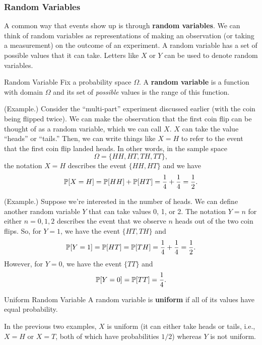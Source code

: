 \documentclass[letterpaper]{article}
\begin{document}
\subsubsection{Random Variables}
A common way that events show up is through \textbf{random variables}. We can think of random variables as representations of making an observation (or taking a measurement) on the outcome of an experiment. A random variable has a set of possible values that it can take. Letters like $X$ or $Y$ can be used to denote random variables. 
\begin{definition}{Random Variable}{}
    Fix a probability space $\Omega$. A \textbf{random variable} is a function with domain $\Omega$ and its set of \emph{possible} values is the range of this function. 
\end{definition}

\begin{mdframed}
    (Example.) Consider the ``multi-part'' experiment discussed earlier (with the coin being flipped twice). We can make the observation that the first coin flip can be thought of as a random variable, which we can call $X$. $X$ can take the value ``heads'' or ``tails.'' Then, we can write things like $X = H$ to refer to the event that the first coin flip landed heads. In other words, in the sample space \[\Omega = \{HH, HT, TH, TT\},\] the notation $X = H$ describes the event $\{HH, HT\}$ and we have \[\mathbb{P}[X = H] = \mathbb{P}[HH] + \mathbb{P}[HT] = \frac{1}{4} + \frac{1}{4} = \frac{1}{2}.\]
\end{mdframed}

\begin{mdframed}
    (Example.) Suppose we're interested in the number of heads. We can define another random variable $Y$ that can take values 0, 1, or 2. The notation $Y = n$ for either $n = 0, 1, 2$ describes the event that we observe $n$ heads out of the two coin flips. So, for $Y = 1$, we have the event $\{HT, TH\}$ and \[\mathbb{P}[Y = 1] = \mathbb{P}[HT] = \mathbb{P}[TH] = \frac{1}{4} + \frac{1}{4} = \frac{1}{2}.\]
    However, for $Y = 0$, we have the event $\{TT\}$ and \[\mathbb{P}[Y = 0] = \mathbb{P}[TT] = \frac{1}{4}.\]
\end{mdframed}

\begin{definition}{Uniform Random Variable}{}
    A random variable is \textbf{uniform} if all of its values have equal probability.
\end{definition}
In the previous two examples, $X$ is uniform (it can either take heads or tails, i.e., $X = H$ or $X = T$, both of which have probabilities $1/2$) whereas $Y$ is not uniform.
\end{document}
